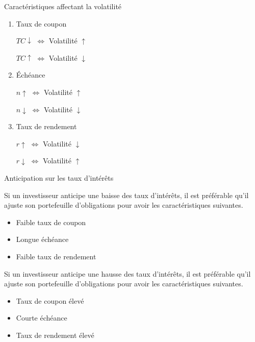 \documentclass{beamer}
\begin{document}
\begin{frame}{Caractéristiques affectant la volatilité}
\begin{enumerate}
\item Taux de coupon 
\begin{center}
$TC \downarrow$ \hspace{1cm} $\Longleftrightarrow$  \hspace{1cm} Volatilité $\uparrow$
\end{center}
\begin{center}
$TC \uparrow$ \hspace{1cm} $\Longleftrightarrow$  \hspace{1cm} Volatilité $\downarrow$
\end{center}
\item Échéance
\begin{center}
$n \uparrow$ \hspace{1cm} $\Longleftrightarrow$  \hspace{1cm} Volatilité $\uparrow$
\end{center}
\begin{center}
$n \downarrow$ \hspace{1cm} $\Longleftrightarrow$  \hspace{1cm} Volatilité $\downarrow$
\end{center}
\item Taux de rendement 
\begin{center}
$r \uparrow$ \hspace{1cm} $\Longleftrightarrow$  \hspace{1cm} Volatilité $\downarrow$
\end{center}
\begin{center}
$r \downarrow$ \hspace{1cm} $\Longleftrightarrow$  \hspace{1cm} Volatilité $\uparrow$
\end{center}
\end{enumerate}
\end{frame}

\begin{frame}{Anticipation sur les taux d'intérêts}

Si un investisseur anticipe une baisse des taux d'intérêts,  il est préférable qu'il ajuste son portefeuille d'obligations pour avoir les caractéristiques suivantes.
\begin{itemize}
\item Faible taux de coupon
\item Longue échéance 
\item Faible taux de rendement 
\end{itemize}
Si un investisseur anticipe une hausse des taux d'intérêts, il est préférable qu'il ajuste son portefeuille d'obligations pour avoir les caractéristiques suivantes.
\begin{itemize}
\item Taux de coupon élevé
\item Courte échéance 
\item Taux de rendement élevé
\end{itemize}
\end{frame}
\end{document}
